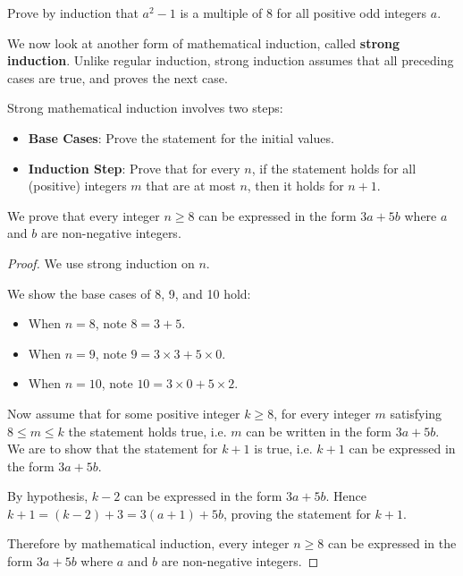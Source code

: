 \begin{exercise}
    Prove by induction that $a^2 - 1$ is a multiple of 8 for all positive odd integers $a$.
\end{exercise}

We now look at another form of mathematical induction, called \textbf{strong induction}. Unlike regular induction, strong induction assumes that all preceding cases are true, and proves the next case.

Strong mathematical induction involves two steps:
\begin{itemize}
    \item \textbf{Base Cases}: Prove the statement for the initial values.
    \item \textbf{Induction Step}: Prove that for every $n$, if the statement holds for all (positive) integers $m$ that are at most $n$, then it holds for $n + 1$.
\end{itemize}

\begin{example}
    We prove that every integer $n \geq 8$ can be expressed in the form $3a + 5b$ where $a$ and $b$ are non-negative integers.
    \begin{proof}
        We use strong induction on $n$.
        
        We show the base cases of 8, 9, and 10 hold:
        \begin{itemize}
            \item When $n = 8$, note $8 = 3 + 5$.
            \item When $n = 9$, note $9 = 3 \times 3 + 5 \times 0$.
            \item When $n = 10$, note $10 = 3 \times 0 + 5 \times 2$.
        \end{itemize}
        
        Now assume that for some positive integer $k \geq 8$, for every integer $m$ satisfying $8 \leq m \leq k$ the statement holds true, i.e. $m$ can be written in the form $3a + 5b$. We are to show that the statement for $k+1$ is true, i.e. $k+1$ can be expressed in the form $3a + 5b$.
        
        By hypothesis, $k - 2$ can be expressed in the form $3a+5b$. Hence $k+1 = (k-2) + 3 = 3(a+1) + 5b$, proving the statement for $k+1$.
        
        Therefore by mathematical induction, every integer $n \geq 8$ can be expressed in the form $3a + 5b$ where $a$ and $b$ are non-negative integers.
    \end{proof}
\end{example}

